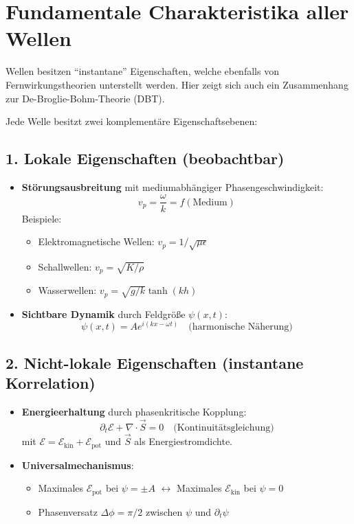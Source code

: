 \section{Fundamentale Charakteristika aller Wellen}
\label{sec:wellen}
Wellen besitzen \enquote{instantane} Eigenschaften, welche ebenfalls von Fernwirkungstheorien unterstellt werden.
Hier zeigt sich auch ein Zusammenhang zur De-Broglie-Bohm-Theorie (DBT).

Jede Welle besitzt zwei komplementäre Eigenschaftsebenen:

\subsection*{1. Lokale Eigenschaften (beobachtbar)}
\begin{itemize}
    \item \textbf{Störungsausbreitung} mit mediumabhängiger Phasengeschwindigkeit:
    \[
    v_p = \frac{\omega}{k} = f(\text{Medium})
    \]
    Beispiele:
    \begin{itemize}
        \item Elektromagnetische Wellen: $v_p = 1/\sqrt{\mu\epsilon}$
        \item Schallwellen: $v_p = \sqrt{K/\rho}$
        \item Wasserwellen: $v_p = \sqrt{g/k} \tanh(kh)$
    \end{itemize}
    
    \item \textbf{Sichtbare Dynamik} durch Feldgröße $\psi(x,t)$:
    \[
    \psi(x,t) = A e^{i(kx-\omega t)} \quad \text{(harmonische Näherung)}
    \]
\end{itemize}

\subsection*{2. Nicht-lokale Eigenschaften (instantane Korrelation)}
\begin{itemize}
    \item \textbf{Energieerhaltung} durch phasenkritische Kopplung:
    \[
    \partial_t \mathcal{E} + \nabla \cdot \vec{S} = 0 \quad \text{(Kontinuitätsgleichung)}
    \]
    mit $\mathcal{E} = \mathcal{E}_\text{kin} + \mathcal{E}_\text{pot}$ und $\vec{S}$ als Energiestromdichte.
    
    \item \textbf{Universalmechanismus}:
    \begin{itemize}
        \item Maximales $\mathcal{E}_\text{pot}$ bei $\psi = \pm A$ $\leftrightarrow$ Maximales $\mathcal{E}_\text{kin}$ bei $\psi = 0$
        \item Phasenversatz $\Delta\phi = \pi/2$ zwischen $\psi$ und $\partial_t\psi$
    \end{itemize}
\end{itemize}

